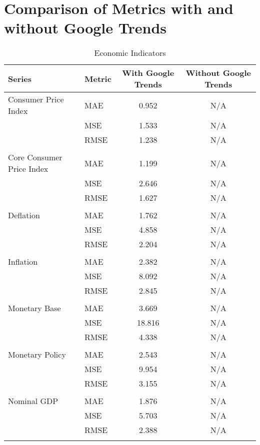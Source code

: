 \documentclass[a4paper,12pt]{article}
\begin{document}
\section*{Comparison of Metrics with and without Google Trends}

\begin{table}
\caption{Economic Indicators}
\label{tab:metrics_comparison_Economic_Indicators}
\begin{tabular}{llcc}
\toprule
Series & Metric & With Google Trends & Without Google Trends \\
\midrule
Consumer Price Index & MAE & 0.952 & N/A \\
 & MSE & 1.533 & N/A \\
 & RMSE & 1.238 & N/A \\
\arrayrulecolor{black!30}\midrule &  &  &  \\
Core Consumer Price Index & MAE & 1.199 & N/A \\
 & MSE & 2.646 & N/A \\
 & RMSE & 1.627 & N/A \\
\arrayrulecolor{black!30}\midrule &  &  &  \\
Deflation & MAE & 1.762 & N/A \\
 & MSE & 4.858 & N/A \\
 & RMSE & 2.204 & N/A \\
\arrayrulecolor{black!30}\midrule &  &  &  \\
Inflation & MAE & 2.382 & N/A \\
 & MSE & 8.092 & N/A \\
 & RMSE & 2.845 & N/A \\
\arrayrulecolor{black!30}\midrule &  &  &  \\
Monetary Base & MAE & 3.669 & N/A \\
 & MSE & 18.816 & N/A \\
 & RMSE & 4.338 & N/A \\
\arrayrulecolor{black!30}\midrule &  &  &  \\
Monetary Policy & MAE & 2.543 & N/A \\
 & MSE & 9.954 & N/A \\
 & RMSE & 3.155 & N/A \\
\arrayrulecolor{black!30}\midrule &  &  &  \\
Nominal GDP & MAE & 1.876 & N/A \\
 & MSE & 5.703 & N/A \\
 & RMSE & 2.388 & N/A \\
\arrayrulecolor{black!30}\midrule &  &  &  \\

\end{tabular}
\end{table}
\end{document}
